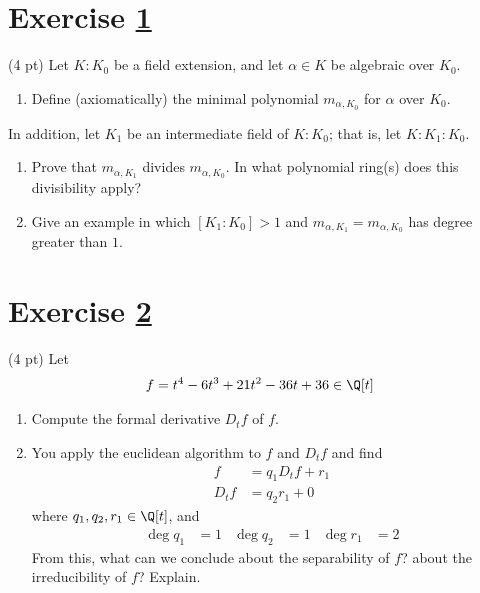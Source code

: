 %
%



\section{Exercise \ref{sec : me02q1}}
\label{sec : me02q1}

(4 pt) Let $K : K_{0}$ be a field extension, and let $\alpha \in K$ be algebraic over $K_{0}$.

\begin{enumerate}[label=(\alph*)]
\item\label{itm : me02q1a} Define (axiomatically) the minimal polynomial $m_{\alpha, K_{0}}$ for $\alpha$ over $K_{0}$.
\end{enumerate}
In addition, let $K_{1}$ be an intermediate field of $K : K_{0}$; that is, let $K : K_{1} : K_{0}$.
\begin{enumerate}[resume, label=(\alph*)]
\item\label{itm : me02q1b} Prove that $m_{\alpha, K_{1}}$ divides $m_{\alpha, K_{0}}$. In what polynomial ring(s) does this divisibility apply?
\item\label{itm : me02q1c} Give an example in which $[K_{1} : K_{0}] > 1$ and $m_{\alpha, K_{1}} = m_{\alpha, K_{0}}$ has degree greater than $1$.
\end{enumerate}



\section{Exercise \ref{sec : me02q2}}
\label{sec : me02q2}

(4 pt) Let
\begin{align*}
f
=
t^{4} - 6 t^{3} + 21 t^{2} - 36 t + 36
\in
\Q[t]
\end{align*}
\begin{enumerate}[label=(\alph*)]
\item\label{itm : me02q2a} Compute the formal derivative $D_{t} f$ of $f$.
\item\label{itm : me02q2b} You apply the euclidean algorithm to $f$ and $D_{t} f$ and find
\begin{align*}
f
&=
q_{1} D_{t} f + r_{1}
\\
D_{t} f
&=
q_{2} r_{1} + 0
\end{align*}
where $q_{1}, q_{2}, r_{1} \in \Q[t]$, and
\begin{align*}
\deg q_{1}
&=
1
&
\deg q_{2}
&=
1
&
\deg r_{1}
&=
2
\end{align*}
From this, what can we conclude about the separability of $f$? about the irreducibility of $f$? Explain.
\end{enumerate}

